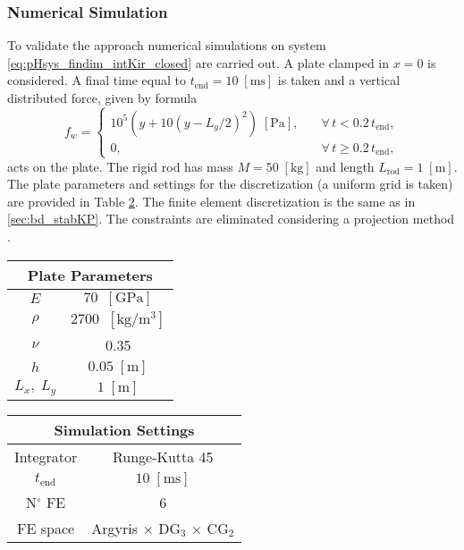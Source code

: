 \subsubsection{Numerical Simulation}
To validate the approach numerical simulations on system \eqref{eq:pHsys_findim_intKir_closed} are carried out. A  plate clamped in $x=0$ is considered. A final time equal to $t_{\text{end}} = 10 \; \mathrm{[ms]}$ is taken and a vertical distributed force, given by formula
\begin{equation}\label{eq:force_rod}
f_w = \begin{cases}
10^5 \left( y + 10 \left( y - L_y/2 \right)^2 \right) \; \mathrm{[Pa]}, \quad &\forall \, t < 0.2 \, t_{\text{end}}, \\
0, \quad &\forall \, t \ge 0.2 \, t_{\text{end}},
\end{cases}
\end{equation}
acts on the plate. The rigid rod has mass $M = 50 \; \mathrm{[kg]}$ and length $L_{\text{rod}} = 1 \; \mathrm{[m]}$. The plate parameters and settings for the discretization (a uniform grid is taken) are provided in Table \ref{tab:parKirInt}. The finite element discretization is the same as in \ref{sec:bd_stabKP}.  The constraints are eliminated considering a projection method \cite{benner2015time}.

\begin{table}[hbt]
	\centering
	\begin{tabular}{|c|c|}
		\hline 
		\multicolumn{2}{|c|}{Plate Parameters} \\ 
		\hline 
		$E$ & $70\; \; \mathrm{[GPa]}$ \\ 
		$\rho$ & $2700\; \; \mathrm{[kg / m^3]}$ \\ 
		$\nu$& 0.35 \\ 
		$h$& $0.05\;  \mathrm{[m]}$ \\ 
		$L_x, \; L_y$& $1\;  \mathrm{[m]}$\\ 
		\hline 
	\end{tabular} \hspace{1cm}
	\begin{tabular}{|c|c|}
		\hline 
		\multicolumn{2}{|c|}{Simulation Settings} \\ 
		\hline 
		Integrator & Runge-Kutta 45 \\
		$t_{\text{end}}$ & $10 \; \mathrm{[ms]}$\\
		N$^\circ$ FE & 6 \\
		FE space & Argyris $\times$ DG$_3$ $\times$ CG$_2$\\
		\hline 
	\end{tabular} 
	\captionsetup{width=0.95\linewidth}
	\vspace{1mm}
	\label{tab:parKirInt}
\end{table}


